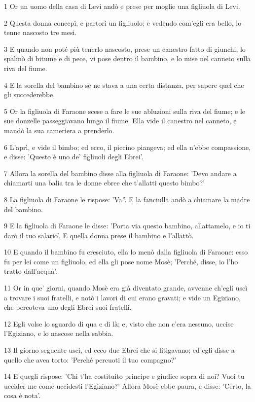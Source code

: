 \par 1 Or un uomo della casa di Levi andò e prese per moglie una figliuola di Levi.
\par 2 Questa donna concepì, e partorì un figliuolo; e vedendo com'egli era bello, lo tenne nascosto tre mesi.
\par 3 E quando non poté più tenerlo nascosto, prese un canestro fatto di giunchi, lo spalmò di bitume e di pece, vi pose dentro il bambino, e lo mise nel canneto sulla riva del fiume.
\par 4 E la sorella del bambino se ne stava a una certa distanza, per sapere quel che gli succederebbe.
\par 5 Or la figliuola di Faraone scese a fare le sue abluzioni sulla riva del fiume; e le sue donzelle passeggiavano lungo il fiume. Ella vide il canestro nel canneto, e mandò la sua cameriera a prenderlo.
\par 6 L'aprì, e vide il bimbo; ed ecco, il piccino piangeva; ed ella n'ebbe compassione, e disse: 'Questo è uno de' figliuoli degli Ebrei'.
\par 7 Allora la sorella del bambino disse alla figliuola di Faraone: 'Devo andare a chiamarti una balia tra le donne ebree che t'allatti questo bimbo?'
\par 8 La figliuola di Faraone le rispose: 'Va''. E la fanciulla andò a chiamare la madre del bambino.
\par 9 E la figliuola di Faraone le disse: 'Porta via questo bambino, allattamelo, e io ti darò il tuo salario'. E quella donna prese il bambino e l'allattò.
\par 10 E quando il bambino fu cresciuto, ella lo menò dalla figliuola di Faraone: esso fu per lei come un figliuolo, ed ella gli pose nome Mosè; 'Perché, disse, io l'ho tratto dall'acqua'.
\par 11 Or in que' giorni, quando Mosè era già diventato grande, avvenne ch'egli uscì a trovare i suoi fratelli, e notò i lavori di cui erano gravati; e vide un Egiziano, che percoteva uno degli Ebrei suoi fratelli.
\par 12 Egli volse lo sguardo di qua e di là; e, visto che non c'era nessuno, uccise l'Egiziano, e lo nascose nella sabbia.
\par 13 Il giorno seguente uscì, ed ecco due Ebrei che si litigavano; ed egli disse a quello che avea torto: 'Perché percuoti il tuo compagno?'
\par 14 E quegli rispose: 'Chi t'ha costituito principe e giudice sopra di noi? Vuoi tu uccider me come uccidesti l'Egiziano?' Allora Mosè ebbe paura, e disse: 'Certo, la cosa è nota'.
